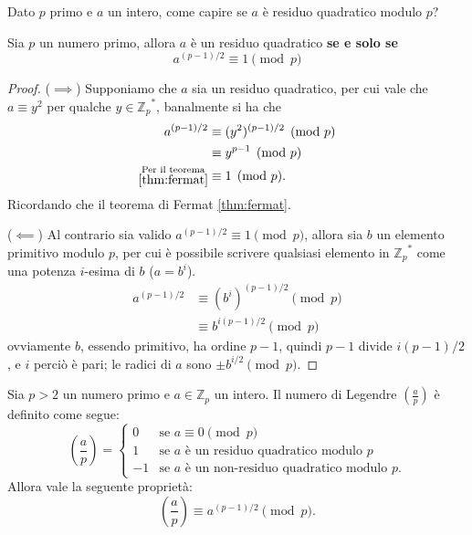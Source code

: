 \vspace{0.2cm}\noindent Dato $p$ primo e $a$ un intero, come capire se $a$ è residuo quadratico modulo $p$?

\begin{theorem}
    \label{thm:3}
    Sia $p$ un numero primo, allora $a$ è un residuo quadratico \textbf{se e solo se} 
    \[
        a^{(p-1)/2} \equiv 1 \pmod p
    \]
\end{theorem}
\begin{proof}
    ($\implies$) Supponiamo che $a$ sia un residuo quadratico, per cui vale che $a \equiv y^2$ per qualche $y \in {\mathbb{Z}_p}^*$, banalmente si ha che 
    \begin{align*}
        a^{(p-1)/2} &\equiv (y^{2})^{(p-1)/2} \pmod p\\
        &\equiv y^{p-1} \pmod p\\
        \substack{\text{Per il teorema} \\\ref{thm:fermat}}  & \equiv 1 \pmod p.
    \end{align*}
    Ricordando che il teorema di Fermat \ref{thm:fermat}.

    \vspace{1em} ($\impliedby$)
    Al contrario sia valido $a^{(p-1)/2} \equiv 1 \pmod p$, allora sia $b$ un elemento primitivo modulo $p$, per cui è possibile scrivere qualsiasi elemento in ${\mathbb{Z}_p}^*$ come una potenza $i$-esima di $b$ ($a = b^i$).
    \begin{align*}
        a^{(p-1)/2} &\equiv (b^i)^{(p-1)/2} \pmod p\\
        &\equiv b^{i(p-1)/2} \pmod p 
    \end{align*}
    ovviamente $b$, essendo primitivo, ha ordine $p-1$, quindi $p-1$ divide $i(p-1)/2$, e $i$ perciò è pari; le radici di $a$ sono $\pm b^{i/2} \pmod p$.
\end{proof}

\begin{theorem}
    Sia $p>2$ un numero primo e $a \in \mathbb{Z}_p$ un intero. Il numero di Legendre $\left(\frac{a}{p}\right)$ è definito come segue:
    \[
        \left( \frac{a}{p}\right) = \begin{cases}
            0 & \text{se } a \equiv 0 \pmod p\\
            1 & \text{se $a$ è un residuo quadratico modulo $p$}\\
            -1 & \text{se $a$ è un non-residuo quadratico modulo $p$}.
        \end{cases}
    \] Allora vale la seguente proprietà:
    \[
        \left(\frac{a}{p}\right) \equiv a^{(p-1)/2} \pmod p .
    \]
\end{theorem}

